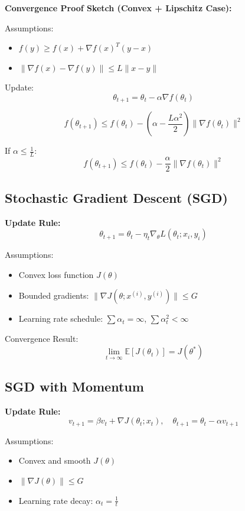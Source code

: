 \documentclass[12pt]{article}
\begin{document}
\textbf{Convergence Proof Sketch (Convex + Lipschitz Case):}

Assumptions:
\begin{itemize}
    \item $f(y) \geq f(x) + \nabla f(x)^T(y - x)$
    \item $\|\nabla f(x) - \nabla f(y)\| \leq L\|x - y\|$
\end{itemize}

Update:
\[
\theta_{t+1} = \theta_t - \alpha \nabla f(\theta_t)
\]

\[
f(\theta_{t+1}) \leq f(\theta_t) - \left( \alpha - \frac{L\alpha^2}{2} \right) \|\nabla f(\theta_t)\|^2
\]

If $\alpha \leq \frac{1}{L}$:
\[
f(\theta_{t+1}) \leq f(\theta_t) - \frac{\alpha}{2} \|\nabla f(\theta_t)\|^2
\]

\subsection{Stochastic Gradient Descent (SGD)}
\textbf{Update Rule:}
\[
\theta_{t+1} = \theta_t - \eta_t \nabla_\theta L(\theta_t; x_i, y_i)
\]

Assumptions:
\begin{itemize}
    \item Convex loss function $J(\theta)$
    \item Bounded gradients: $\|\nabla J(\theta;x^{(i)},y^{(i)})\| \leq G$
    \item Learning rate schedule: $\sum \alpha_t = \infty$, $\sum \alpha_t^2 < \infty$
\end{itemize}

Convergence Result:
\[
\lim_{t \to \infty} \mathbb{E}[J(\theta_t)] = J(\theta^*)
\]

\subsection{SGD with Momentum}

\textbf{Update Rule:}
\[
v_{t+1} = \beta v_t + \nabla J(\theta_t; x_t), \quad
\theta_{t+1} = \theta_t - \alpha v_{t+1}
\]

Assumptions:
\begin{itemize}
    \item Convex and smooth $J(\theta)$
    \item $\|\nabla J(\theta)\| \leq G$
    \item Learning rate decay: $\alpha_t = \frac{1}{t}$
\end{itemize}
\end{document}

